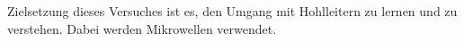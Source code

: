 Zielsetzung dieses Versuches ist es, den Umgang mit Hohlleitern zu lernen und zu verstehen. Dabei werden Mikrowellen verwendet.